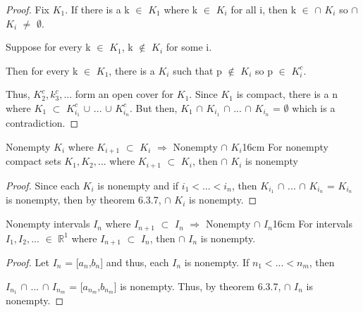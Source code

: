 	\begin{proof}
		Fix $K_1$.
		If there is a k $\in$ $K_1$ where k $\in$ $K_i$ for all i, then
		k $\in$ $\cap$ $K_i$ so $\cap$ $K_i$ $\not =$ $\emptyset$.

		Suppose for every k $\in$ $K_1$, k $\not \in$ $K_i$ for some i.

		Then for every k $\in$ $K_1$, there is a $K_i$ such that
		p $\not \in$ $K_i$ so p $\in$ $K_i^c$.

		Thus, $K_2^c, k_3^c, ...$ form an open cover for $K_1$.
		Since $K_1$ is compact, there is a n where
		$K_1$ $\subset$ $K_{i_1}^c$ $\cup$ ... $\cup$ $K_{i_n}^c$.
		But then, $K_1$ $\cap$ $K_{i_1}$ $\cap$ ... $\cap$ $K_{i_n}$
		= $\emptyset$ which is a contradiction.
	\end{proof}

	\vspace{0.5cm}



	\begin{corollary}{Nonempty $K_i$ where $K_{i+1}$ $\subset$ $K_i$
	$\Rightarrow$ Nonempty $\cap$ $K_i$}{16cm}
		For nonempty compact sets $K_1, K_2, ...$ where $K_{i+1}$ $\subset$ $K_i$,
		then $\cap$ $K_i$ is nonempty 
	\end{corollary}
	
	\begin{proof}
		Since each $K_i$ is nonempty and if $i_1 < ... < i_n$, then
		$K_{i_1}$ $\cap$ ... $\cap$ $K_{i_n}$
		= $K_{i_n}$ is nonempty, then
		by {\color{red} theorem 6.3.7}, $\cap$ $K_i$ is nonempty.
	\end{proof}

	\vspace{0.5cm}




	\begin{wtheorem}{Nonempty intervals $I_n$ where
	$I_{n+1}$ $\subset$ $I_n$ $\Rightarrow$ Nonempty $\cap$ $I_n$}{16cm}
		For intervals $I_1, I_2, ...$ $\in$ $\mathbb{R}^1$
		where $I_{n+1}$ $\subset$ $I_n$,
		then $\cap$ $I_n$ is nonempty.
	\end{wtheorem}
	
	\begin{proof}
		Let $I_n$ = [$a_n$,$b_n$] and thus, each $I_n$ is nonempty.
		If $n_1 < ... < n_m$, then

		$I_{n_1}$ $\cap$ ... $\cap$ $I_{n_m}$
		= [$a_{n_m}$,$b_{n_m}$] is nonempty.
		Thus, by {\color{red} theorem 6.3.7}, $\cap$ $I_n$ is nonempty.	
	\end{proof}

